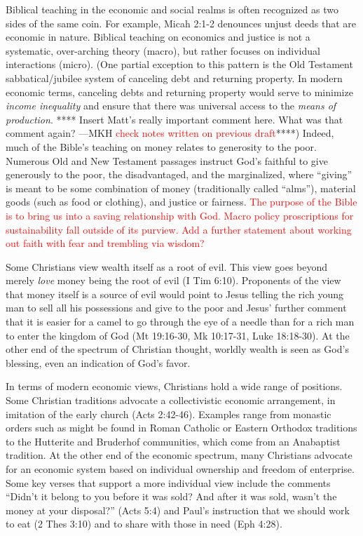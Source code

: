\documentclass[12pt]{article}
\newcommand{\ins}[1]{\textcolor{red}{#1}}
\begin{document}
Biblical teaching in the economic and social realms is often recognized 
as two sides of the same coin. 
For example, Micah 2:1-2 denounces unjust deeds that are economic in nature. 
Biblical teaching on economics and justice is not a
systematic, over-arching theory (macro),
but rather focuses on individual interactions (micro).
(One partial exception to this pattern is the Old Testament sabbatical/jubilee system 
of canceling debt and returning property.
In modern economic terms, canceling debts and returning property would serve to minimize 
\emph{income inequality} and ensure that there was universal access to the \emph{means of production}.
**** Insert Matt's really important comment here.
What was that comment again? ---MKH \ins{check notes written on previous draft}****)
Indeed, much of the Bible's
teaching on money relates to generosity to the poor. 
Numerous Old and New Testament passages instruct God's faithful to
give generously to the poor, the disadvantaged, and the marginalized, 
where ``giving'' is meant to be some combination of 
money (traditionally called ``alms''), 
material goods (such as food or clothing), and 
justice or fairness.
\ins{The purpose of the Bible is to bring us into a saving relationship with God.
Macro policy proscriptions for sustainability fall outside of its purview.
Add a further statement about working out faith with fear and trembling via wisdom?} 

Some Christians view wealth itself as a root of evil. 
This view goes beyond merely \emph{love} money
being the root of evil (I Tim 6:10). 
Proponents of the view that money itself is a source of evil would point to Jesus
telling the rich young man to sell all his possessions and give to the poor and 
Jesus' further comment that it is easier
for a camel to go through the eye of a needle than 
for a rich man to enter the kingdom of God (Mt 19:16-30, Mk 10:17-31, Luke 18:18-30). 
At the other end of the spectrum of Christian thought, 
worldly wealth is seen as God's blessing, 
even an indication of God's favor.

In terms of modern economic views, Christians hold a wide range of positions. 
Some Christian traditions advocate a
collectivistic economic arrangement, in imitation of the early church (Acts 2:42-46). 
Examples range from monastic orders such as
might be found in Roman Catholic or Eastern Orthodox traditions 
to the Hutterite and Bruderhof communities, 
which come from an Anabaptist tradition. 
At the other end of the economic spectrum, many Christians advocate for an economic system
based on individual ownership and freedom of enterprise. 
Some key verses that support a more individual view include the comments 
``Didn’t it belong to you before it was sold? And after it was sold, 
wasn’t the money at your disposal?'' (Acts 5:4) and 
Paul's instruction that we should work to eat (2 Thes 3:10) and to share with those in need (Eph 4:28).
\end{document}
